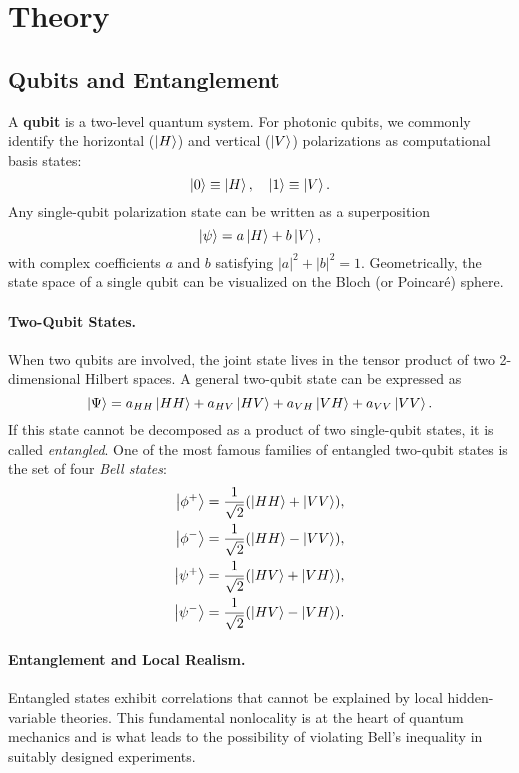 \section{Theory}

\subsection{Qubits and Entanglement}
A \textbf{qubit} is a two-level quantum system. For photonic qubits, we commonly identify the horizontal ($\ket{H}$) and vertical ($\ket{V}$) polarizations as computational basis states:
\[
\ket{0} \equiv \ket{H}, 
\quad
\ket{1} \equiv \ket{V}.
\]
Any single-qubit polarization state can be written as a superposition
\[
\ket{\psi} = a \ket{H} + b \ket{V},
\]
with complex coefficients $a$ and $b$ satisfying $|a|^2 + |b|^2 = 1$. Geometrically, the state space of a single qubit can be visualized on the Bloch (or Poincaré) sphere.

\paragraph{Two-Qubit States.}
When two qubits are involved, the joint state lives in the tensor product of two 2-dimensional Hilbert spaces. A general two-qubit state can be expressed as
\[
\ket{\Psi} = 
  a_{HH}\ket{HH} + a_{HV}\ket{HV} + a_{VH}\ket{VH} + a_{VV}\ket{VV}.
\]
If this state cannot be decomposed as a product of two single-qubit states, it is called \emph{entangled}. One of the most famous families of entangled two-qubit states is the set of four \emph{Bell states}:
\begin{align*}
\ket{\phi^+} &= \frac{1}{\sqrt{2}}(\ket{HH} + \ket{VV}), \\
\ket{\phi^-} &= \frac{1}{\sqrt{2}}(\ket{HH} - \ket{VV}), \\
\ket{\psi^+} &= \frac{1}{\sqrt{2}}(\ket{HV} + \ket{VH}), \\
\ket{\psi^-} &= \frac{1}{\sqrt{2}}(\ket{HV} - \ket{VH}).
\end{align*}

\paragraph{Entanglement and Local Realism.}
Entangled states exhibit correlations that cannot be explained by local hidden-variable theories. This fundamental nonlocality is at the heart of quantum mechanics and is what leads to the possibility of violating Bell's inequality in suitably designed experiments.

